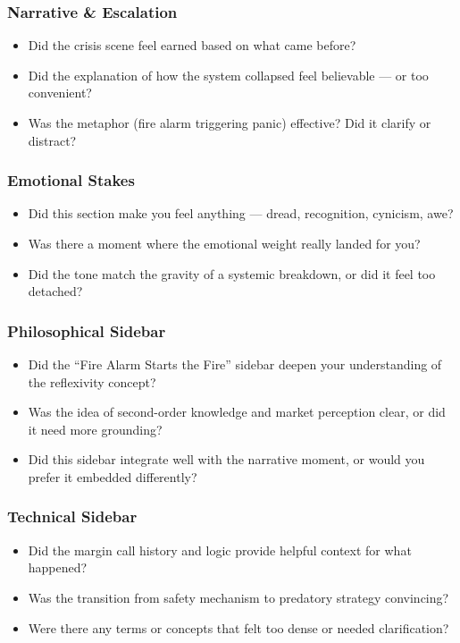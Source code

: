 \subsubsection{Narrative \& Escalation}

\begin{itemize}
  \item Did the crisis scene feel earned based on what came before?
  \item Did the explanation of how the system collapsed feel believable — or too convenient?
  \item Was the metaphor (fire alarm triggering panic) effective? Did it clarify or distract?
\end{itemize}

\subsubsection{Emotional Stakes}

\begin{itemize}
  \item Did this section make you feel anything — dread, recognition, cynicism, awe?
  \item Was there a moment where the emotional weight really landed for you?
  \item Did the tone match the gravity of a systemic breakdown, or did it feel too detached?
\end{itemize}

\subsubsection{Philosophical Sidebar}

\begin{itemize}
  \item Did the “Fire Alarm Starts the Fire” sidebar deepen your understanding of the reflexivity concept?
  \item Was the idea of second-order knowledge and market perception clear, or did it need more grounding?
  \item Did this sidebar integrate well with the narrative moment, or would you prefer it embedded differently?
\end{itemize}

\subsubsection{Technical Sidebar}

\begin{itemize}
  \item Did the margin call history and logic provide helpful context for what happened?
  \item Was the transition from safety mechanism to predatory strategy convincing?
  \item Were there any terms or concepts that felt too dense or needed clarification?
\end{itemize}

